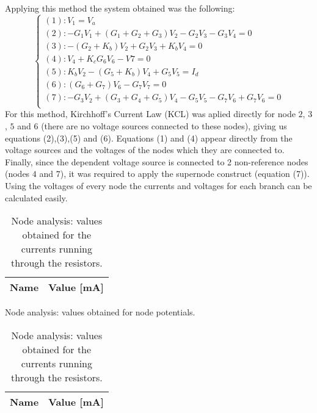Applying this method the system obtained was the following:
\begin{equation}
  \begin{cases}
    \left(1\right): V_{1}=V_{a}                                                                        \\
    \left(2\right): -G_{1}V_{1}+\left(G_{1}+G_{2}+G_{3}\right)V_{2}-G_{2}V_{3}-G_{3}V_{4}=0            \\
    \left(3\right): -\left(G_{2}+K_{b}\right)V_{2}+G_{2}V_{3}+K_{b}V_{4}=0                             \\
    \left(4\right): V_{4}+K_{c}G_{6}V_{6}-V{7}=0                                                       \\
    \left(5\right): K_{b}V_{2}-\left(G_{5}+K_{b}\right)V_{4} +G_{5}V_{5}=I_{d}                       \\
    \left(6\right): \left(G_{6}+G_{7}\right)V_{6}-G_{7}V_{7}=0                                         \\
    \left(7\right): -G_{3}V_{2}+\left(G_{3}+G_{4}+G_{5}\right)V_{4}-G_{5}V_{5}-G_{7}V_{6}+G_{7}V_{6}=0 \\
  \end{cases}
\end{equation}
For this method, Kirchhoff's Current Law (KCL) was aplied directly for node $2$, $3$, $5$ and $6$ (there are no voltage sources connected to these nodes), giving us equations (2),(3),(5) and (6). Equations (1) and (4) appear directly from the voltage sources  and the voltages of the nodes which they are connected to. Finally, since the dependent voltage source is connected to 2 non-reference nodes (nodes $4$ and $7$), it was required to apply the supernode construct (equation (7)).
Using the voltages of every node the currents and voltages for each branch can be calculated easily.

\begin{table}[h]
  \centering
  \begin{tabular}{|l|r|}
    \hline
    {\bf Name} & {\bf Value [mA]} \\ \hline
    
  \end{tabular}
  \caption{Node analysis: values obtained for node potentials.}
  \caption{Node analysis: values obtained for the currents running through the resistors.}
  \label{tab:op2}
\end{table}

\begin{table}[h]
  \centering
  \begin{tabular}{|l|r|}
    \hline
    {\bf Name} & {\bf Value [mA]} \\ \hline
    
  \end{tabular}
  \caption{Node analysis: values obtained for the currents running through the resistors.}
  \label{tab:op3}
\end{table}